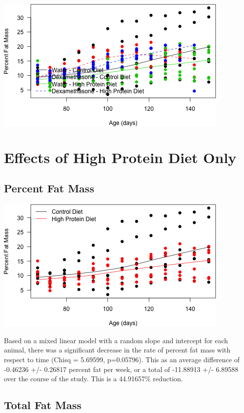 \documentclass[]{article}
\begin{document}
\includegraphics{figures/percent-fat-mass-scatterplot-1.png}

\section{Effects of High Protein Diet
Only}\label{effects-of-high-protein-diet-only}

\subsection{Percent Fat Mass}\label{percent-fat-mass-1}

\includegraphics{figures/percent-fat-mass-scatterplot-hpd-1.png}

Based on a mixed linear model with a random slope and intercept for each
animal, there was a significant decrease in the rate of percent fat mass
with respect to time (Chisq = 5.69599, p=0.05796). This as an average
difference of -0.46236 +/- 0.26817 percent fat per week, or a total of
-11.88913 +/- 6.89588 over the course of the study. This is a 44.91657\%
reduction.

\subsection{Total Fat Mass}\label{total-fat-mass}
\end{document}
